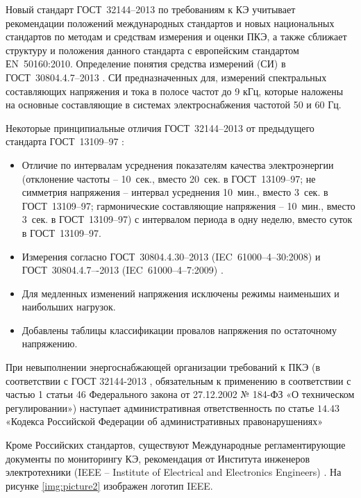 
Новый стандарт ГОСТ~32144--2013 по требованиям к КЭ учитывает рекомендации положений международных стандартов и новых национальных стандартов по методам и средствам измерения и оценки ПКЭ, а также сближает структуру и положения данного стандарта с европейским стандартом ЕN~50160:2010.
Определение понятия средства измерений (СИ) в ГОСТ~30804.4.7--2013 \cite{GOST30804.4.7-2013}.
СИ предназначенных для, измерений спектральных составляющих напряжения и тока в полосе частот до 9 кГц, которые наложены на основные составляющие в системах электроснабжения частотой 50 и 60 Гц.


Некоторые принципиальные отличия  ГОСТ~32144--2013 \cite{GOST32144-2013} от предыдущего стандарта ГОСТ~13109--97 \cite{GOST13109-97}: 
\begin{itemize}
	\item Отличие по интервалам усреднения показателям качества электроэнергии (отклонение частоты -- 10~сек., вместо 20~сек. в ГОСТ~13109--97; не симметрия напряжения -- интервал усреднения 10~мин., вместо 3~сек. в ГОСТ~13109--97; гармонические составляющие напряжения -- 10~мин., вместо 3~сек. в ГОСТ~13109--97) с интервалом периода в одну неделю, вместо суток в ГОСТ~13109--97.
	\item Измерения согласно ГОСТ~30804.4.30--2013 (IEC~61000--4--30:2008) \cite{GOST30804.4.30-2013} и ГОСТ~30804.4.7–-2013 (IEC~61000--4--7:2009) \cite{GOST30804.4.7-2013}.
	\item Для медленных изменений напряжения исключены режимы наименьших и наибольших нагрузок.
	\item Добавлены таблицы классификации провалов напряжения по остаточному напряжению.
\end{itemize}

При невыполнении энергоснабжающей организации требований к ПКЭ (в соответствии с ГОСТ 32144-2013 \cite{GOST32144-2013}, обязательным к применению в соответствии с
частью 1 статьи 46 Федерального закона от 27.12.2002 № 184-ФЗ «О техническом регулировании») наступает административная ответственность по статье $14.43$
«Кодекса Российской Федерации об административных правонарушениях» \cite{Serkov2017Problems} %

Кроме Российских стандартов, существуют Международные регламентирующие документы по мониторингу КЭ, рекомендация от Института инженеров электротехники (IEEE -- Institute of Electrical and Electronics Engineers) \cite{IEEE_PES}. На рисунке \ref{img:picture2} изображен логотип IEEE.

